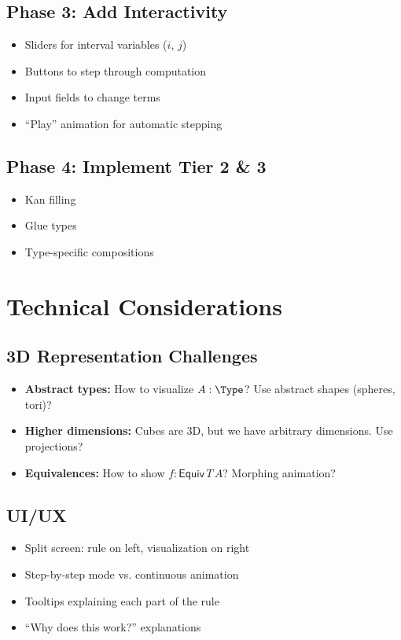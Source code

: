 \documentclass[11pt,a4paper]{article}
\newcommand{\Equiv}[2]{\mathsf{Equiv}\,#1\,#2}
\begin{document}
\subsection{Phase 3: Add Interactivity}
\begin{itemize}
\item Sliders for interval variables ($i$, $j$)
\item Buttons to step through computation
\item Input fields to change terms
\item ``Play'' animation for automatic stepping
\end{itemize}

\subsection{Phase 4: Implement Tier 2 \& 3}
\begin{itemize}
\item Kan filling
\item Glue types
\item Type-specific compositions
\end{itemize}

\section{Technical Considerations}

\subsection{3D Representation Challenges}
\begin{itemize}
\item \textbf{Abstract types:} How to visualize $A : \Type$? Use abstract shapes (spheres, tori)?
\item \textbf{Higher dimensions:} Cubes are 3D, but we have arbitrary dimensions. Use projections?
\item \textbf{Equivalences:} How to show $f : \Equiv{T}{A}$? Morphing animation?
\end{itemize}

\subsection{UI/UX}
\begin{itemize}
\item Split screen: rule on left, visualization on right
\item Step-by-step mode vs. continuous animation
\item Tooltips explaining each part of the rule
\item ``Why does this work?'' explanations
\end{itemize}
\end{document}
